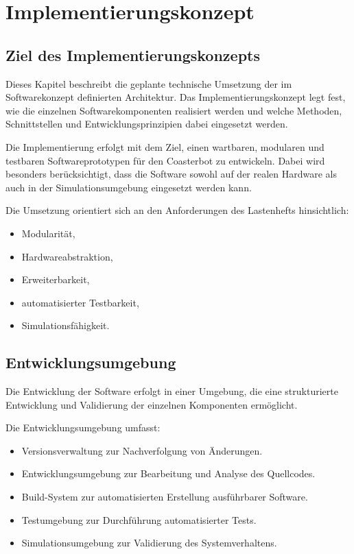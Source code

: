 \documentclass[
  a4paper,
  12pt,
  DIV=12,        %
  parskip=half,  %
  headings=small %
]{scrartcl}
\theoremstyle{definition}
\providecommand{\tightlist}{%
  \setlength{\itemsep}{0pt}\setlength{\parskip}{0pt}}
\theoremstyle{definition}
\begin{document}
\section{Implementierungskonzept}\label{implementierungskonzept}

\subsection{Ziel des
Implementierungskonzepts}\label{ziel-des-implementierungskonzepts}

Dieses Kapitel beschreibt die geplante technische Umsetzung der im
Softwarekonzept definierten Architektur. Das Implementierungskonzept
legt fest, wie die einzelnen Softwarekomponenten realisiert werden und
welche Methoden, Schnittstellen und Entwicklungsprinzipien dabei
eingesetzt werden.

Die Implementierung erfolgt mit dem Ziel, einen wartbaren, modularen und
testbaren Softwareprototypen für den Coasterbot zu entwickeln. Dabei
wird besonders berücksichtigt, dass die Software sowohl auf der realen
Hardware als auch in der Simulationsumgebung eingesetzt werden kann.

Die Umsetzung orientiert sich an den Anforderungen des Lastenhefts
hinsichtlich:

\begin{itemize}
\tightlist
\item
  Modularität,
\item
  Hardwareabstraktion,
\item
  Erweiterbarkeit,
\item
  automatisierter Testbarkeit,
\item
  Simulationsfähigkeit.
\end{itemize}

\subsection{Entwicklungsumgebung}\label{entwicklungsumgebung}

Die Entwicklung der Software erfolgt in einer Umgebung, die eine
strukturierte Entwicklung und Validierung der einzelnen Komponenten
ermöglicht.

Die Entwicklungsumgebung umfasst:

\begin{itemize}
\tightlist
\item
  Versionsverwaltung zur Nachverfolgung von Änderungen.
\item
  Entwicklungsumgebung zur Bearbeitung und Analyse des Quellcodes.
\item
  Build-System zur automatisierten Erstellung ausführbarer Software.
\item
  Testumgebung zur Durchführung automatisierter Tests.
\item
  Simulationsumgebung zur Validierung des Systemverhaltens.
\end{itemize}
\end{document}
